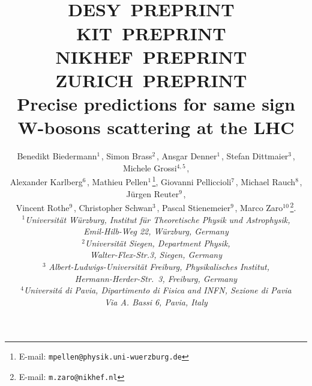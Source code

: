 \documentclass[11pt,epsf]{article}
\begin{document}
\title{\hfill ~\\[-30mm]
\phantom{h} \hfill\mbox{\small DESY PREPRINT } \\
\vspace{-10mm}
\phantom{h} \hfill\mbox{\small KIT PREPRINT } \\
\vspace{-10mm}
\phantom{h} \hfill\mbox{\small NIKHEF PREPRINT } \\
\vspace{-10mm}
\phantom{h} \hfill\mbox{\small ZURICH PREPRINT }
\\[1cm]
\textbf{Precise predictions for same sign W-bosons scattering at the LHC}}

\date{}
\author{
Benedikt Biedermann$^{1\,}$,
Simon Brass$^{2\,}$,
Ansgar Denner$^{1\,}$,
Stefan Dittmaier$^{3\,}$,
Michele Grossi$^{4,5\,}$, \\
Alexander Karlberg$^{6\,}$, 
Mathieu Pellen$^{1\,}$\footnote{E-mail:
  \texttt{mpellen@physik.uni-wuerzburg.de}},
Giovanni  Pelliccioli$^{7\,}$,
Michael Rauch$^{8\,}$,
J\"urgen Reuter$^{9\,}$, \\
Vincent Rothe$^{9\,}$, 
Christopher Schwan$^{3\,}$,
Pascal Stienemeier$^{9\,}$,
Marco Zaro$^{10\,}$\footnote{E-mail:
  \texttt{m.zaro@nikhef.nl}}.
\\[9mm]
{\small\it
$^1$Universit\"at W\"urzburg, %
        Institut f\"ur Theoretische Physik und Astrophysik,} \\ %
{\small\it Emil-Hilb-Weg 22,  W\"urzburg, %
        Germany}\\[3mm]
{\small\it
$^2$Universit\"at Siegen, Department Physik,} \\ %
{\small\it Walter-Flex-Str.3,  Siegen, Germany}\\[3mm]
$^3${\small\it
Albert-Ludwigs-Universit\"at Freiburg, Physikalisches Institut,} \\ %
{\small\it Hermann-Herder-Str.\ 3,  Freiburg, Germany}\\[3mm]
{\small\it
$^4$Universit\'a di Pavia, Dipartimento di Fisica and INFN, Sezione di Pavia } \\ %
{\small\it Via A. Bassi 6,  Pavia, %
        Italy}\\[3mm]
%        
}
\end{document}
